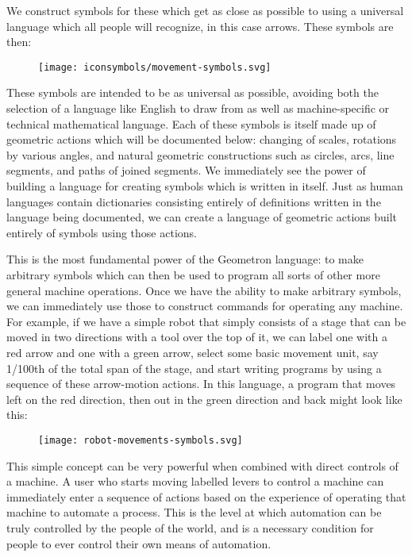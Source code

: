 We construct symbols for these which get as close as possible to using a
universal language which all people will recognize, in this case arrows.
These symbols are then:

\begin{figure}[htbp]
\centering
\texttt{[image: iconsymbols/movement-symbols.svg]}
\caption{}
\end{figure}

These symbols are intended to be as universal as possible, avoiding both
the selection of a language like English to draw from as well as
machine-specific or technical mathematical language. Each of these
symbols is itself made up of geometric actions which will be documented
below: changing of scales, rotations by various angles, and natural
geometric constructions such as circles, arcs, line segments, and paths
of joined segments. We immediately see the power of building a language
for creating symbols which is written in itself. Just as human languages
contain dictionaries consisting entirely of definitions written in the
language being documented, we can create a language of geometric actions
built entirely of symbols using those actions.

This is the most fundamental power of the Geometron language: to make
arbitrary symbols which can then be used to program all sorts of other
more general machine operations. Once we have the ability to make
arbitrary symbols, we can immediately use those to construct commands
for operating any machine. For example, if we have a simple robot that
simply consists of a stage that can be moved in two directions with a
tool over the top of it, we can label one with a red arrow and one with
a green arrow, select some basic movement unit, say 1/100th of the total
span of the stage, and start writing programs by using a sequence of
these arrow-motion actions. In this language, a program that moves left
on the red direction, then out in the green direction and back might
look like this:

\begin{figure}[htbp]
\centering
\texttt{[image: robot-movements-symbols.svg]}
\caption{}
\end{figure}

This simple concept can be very powerful when combined with direct
controls of a machine. A user who starts moving labelled levers to
control a machine can immediately enter a sequence of actions based on
the experience of operating that machine to automate a process. This is
the level at which automation can be truly controlled by the people of
the world, and is a necessary condition for people to ever control their
own means of automation.

